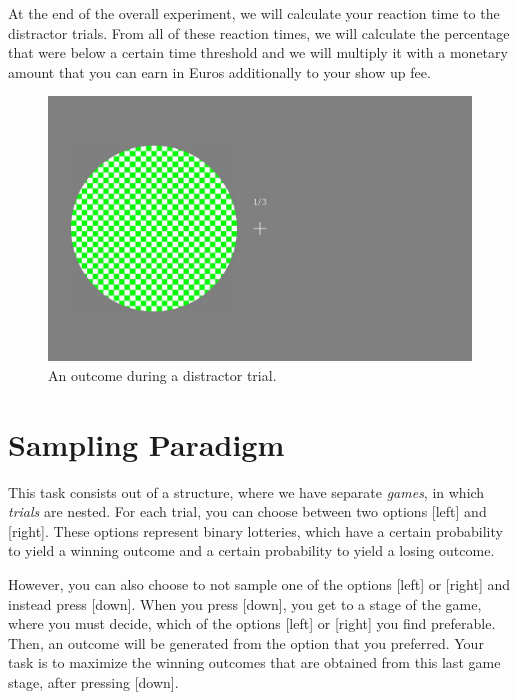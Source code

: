 \documentclass[12pt, oneside]{scrartcl}
\begin{document}
At the end of the overall experiment, we will calculate your reaction time to the distractor trials. From all of these reaction times, we will calculate the percentage that were below a certain time threshold and we will multiply it with a monetary amount that you can earn in Euros additionally to your show up fee. \vspace{\baselineskip}


\begin{figure}[h!]
\begin{center}
\includegraphics[scale=0.2]{distrLeft.jpg}
\caption{An outcome during a distractor trial.}
\label{distrLeft}
\end{center}
\end{figure}



\pagebreak
\section{Sampling Paradigm}

This task consists out of a structure, where we have separate \textit{games}, in which \textit{trials} are nested. For each trial, you can choose between two options [left] and [right]. These options represent binary lotteries, which have a certain probability to yield a winning outcome and a certain probability to yield a losing outcome. \vspace{\baselineskip}

However, you can also choose to not sample one of the options [left] or [right] and instead press [down]. When you press [down], you get to a stage of the game, where you must decide, which of the options [left] or [right] you find preferable. Then, an outcome will be generated from the option that you preferred. Your task is to maximize the winning outcomes that are obtained from this last game stage, after pressing [down]. \vspace{\baselineskip}
\end{document}
